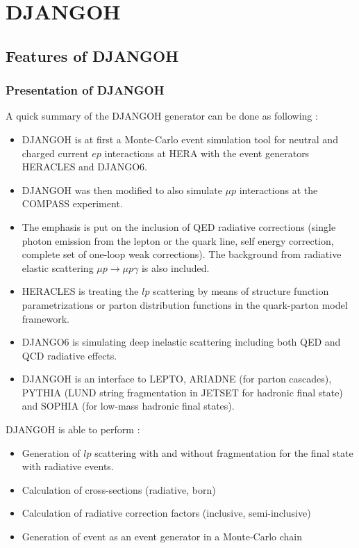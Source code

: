 
\chapter{DJANGOH} %

\label{ch:DJANGOH} %


\section{Features of DJANGOH}

\subsection{Presentation of DJANGOH}
A quick summary of the DJANGOH generator can be done as following :
\begin{itemize}
\item DJANGOH\cite{DJANGOH} is at first a Monte-Carlo event simulation tool for neutral and charged current
$ep$ interactions at HERA with the event generators HERACLES and DJANGO6.
\item DJANGOH was then modified to also simulate $\mu p$ interactions at the COMPASS experiment.
\item The emphasis is put on the inclusion of QED radiative corrections
(single photon emission from the lepton or the quark line, self energy correction, complete
set of one-loop weak corrections). The background from radiative elastic scattering
$\mu p\rightarrow \mu p\gamma$ is also included.
\item HERACLES is treating the $lp$ scattering by means of structure function parametrizations
or parton distribution functions in the quark-parton model framework.
\item DJANGO6 is simulating deep inelastic scattering including both QED and QCD radiative effects.
\item DJANGOH is an interface to LEPTO\cite{LEPTO}, ARIADNE\cite{ARIADNE} (for parton cascades), PYTHIA\cite{PYTHIA6} (LUND
string fragmentation in JETSET\cite{JETSET} for hadronic final state) and SOPHIA\cite{SOPHIA} (for low-mass
hadronic final states).
\end{itemize}
DJANGOH is able to perform :
\begin{itemize}
\item Generation of $lp$ scattering with and without fragmentation for the final state with radiative events.
\item Calculation of cross-sections (radiative, born)
\item Calculation of radiative correction factors (inclusive, semi-inclusive)
\item Generation of event as an event generator in a Monte-Carlo chain
\end{itemize}

